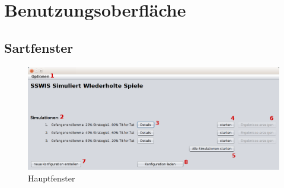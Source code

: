 \section{Benutzungsoberfläche}


\subsection{Sartfenster}

\begin{figure}[hp] 
  \centering
     \includegraphics[width=1.1\textwidth]{GUI_Entwurf/StartfensterBeispiel.png}
  \caption{Hauptfenster}
  \label{fig:Bild1}
\end{figure}

